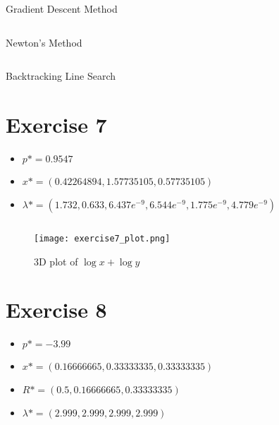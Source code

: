 \documentclass[12pt, a4paper]{article}
\begin{document}
\begin{listing}[H]
  \inputminted[breaklines=true,fontsize=\footnotesize]{python}{../gdm.py}
  \caption{Gradient Descent Method}
\end{listing}

\begin{listing}[H]
  \inputminted[breaklines=true,fontsize=\footnotesize]{python}{../newtons.py}
  \caption{Newton's Method}
\end{listing}

\begin{listing}[H]
  \inputminted[breaklines=true,fontsize=\footnotesize]{python}{../backtracking.py}
  \caption{Backtracking Line Search}
\end{listing}


\newpage
\section*{Exercise 7}%
\label{sec:exercise_7}

\begin{itemize}
  \item $p* = 0.9547$
  \item $x* = (0.42264894, 1.57735105, 0.57735105)$
  \item $\lambda* = (1.732, 0.633, 6.437e^{-9}, 6.544e^{-9}, 1.775e^{-9}, 4.779e^{-9})$
\end{itemize}

\begin{listing}[H]
  \inputminted[breaklines=true,fontsize=\footnotesize]{python}{../exercise7.py}
  \label{lst:exercise7}
  \caption{}
\end{listing}

\begin{figure}[H]
  \centering
  \texttt{[image: exercise7\_plot.png]}
  \label{fig:exercise7}
  \caption{3D plot of $\log x + \log y$}
\end{figure}


\newpage
\section*{Exercise 8}%
\label{sec:exercise_8}

\begin{itemize}
  \item $p* = -3.99$
  \item $x* = (0.16666665, 0.33333335, 0.33333335)$
  \item $R* = (0.5, 0.16666665, 0.33333335)$
  \item $\lambda* = (2.999, 2.999, 2.999, 2.999)$
\end{itemize}

\begin{listing}[H]
  \inputminted[breaklines=true,fontsize=\footnotesize]{python}{../exercise8.py}
  \label{lst:exercise8}
  \caption{}
\end{listing}

\end{document}

